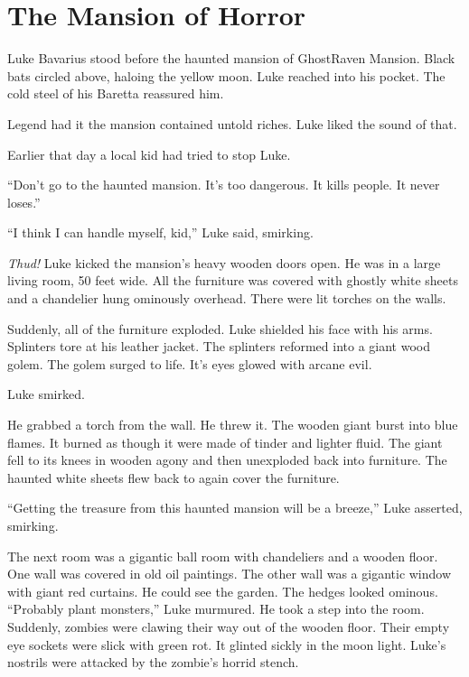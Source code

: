 \chapter{The Mansion of Horror}





Luke Bavarius stood before the haunted mansion of GhostRaven
Mansion. Black bats circled above, haloing the yellow moon. Luke
reached into his pocket. The cold steel of his Baretta reassured
him.



Legend had it the mansion contained untold riches. Luke liked the
sound of that.



Earlier that day a local kid had tried to stop Luke.

``Don't go to the haunted mansion. It's too
dangerous. It kills people. It never loses.''

``I think I can handle myself, kid,'' Luke said,
smirking.



{\em Thud!} Luke kicked the mansion's heavy wooden doors open. He
was in a large living room, 50 feet wide. All the furniture was
covered with ghostly white sheets and a chandelier hung ominously
overhead. There were lit torches on the walls.



Suddenly, all of the furniture exploded. Luke shielded his face
with his arms. Splinters tore at his leather jacket. The splinters
reformed into a giant wood golem. The golem surged to life.
It's eyes glowed with arcane evil.



Luke smirked.



He grabbed a torch from the wall. He threw it. The wooden giant
burst into blue flames. It burned as though it were made of tinder
and lighter fluid. The giant fell to its knees in wooden agony and
then unexploded back into furniture. The haunted white sheets flew
back to again cover the furniture.



``Getting the treasure from this haunted mansion will be a
breeze,'' Luke asserted, smirking.



The next room was a gigantic ball room with chandeliers and a
wooden floor. One wall was covered in old oil paintings. The other
wall was a gigantic window with giant red curtains. He could see
the garden. The hedges looked ominous. ``Probably plant
monsters,'' Luke murmured. He took a step into the room.
Suddenly, zombies were clawing their way out of the wooden floor.
Their empty eye sockets were slick with green rot. It glinted
sickly in the moon light. Luke's nostrils were attacked by
the zombie's horrid stench.



